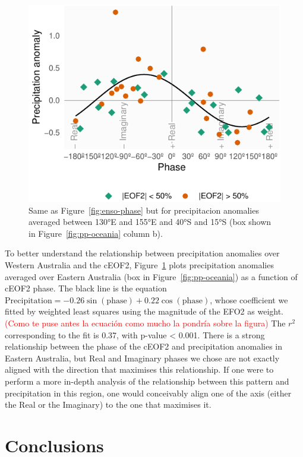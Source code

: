 \documentclass[smallextended]{svjour3}       %
\begin{document}
\begin{figure}
\centering
\includegraphics{../figures/australia-pp-phase-1.pdf}
\caption{\label{fig:australia-pp-phase}Same as Figure~\ref{fig:enso-phase} but for precipitacion anomalies averaged between 130°E and 155°E and 40°S and 15°S (box shown in Figure~\ref{fig:pp-oceania} column b).}
\end{figure}

To better understand the relationship between precipitation anomalies over Western Australia and the cEOF2, Figure~\ref{fig:australia-pp-phase} plots precipitation anomalies averaged over Eastern Australia (box in Figure~\ref{fig:pp-oceania}) as a function of cEOF2 phase. The black line is the equation \(\mathrm{Precipitation} = -0.26\sin{(\mathrm{phase})} + 0.22\cos{(\mathrm{phase})}\), whose coefficient we fitted by weighted least squares using the magnitude of the EFO2 as weight.
\textcolor{red}{(Como te puse antes la ecuación como mucho la pondría sobre la figura)}
The \(r^2\) corresponding to the fit is 0.37, with p-value \textless{} 0.001. There is a strong relationship between the phase of the cEOF2 and precipitation anomalies in Eastern Australia, but Real and Imaginary phases we chose are not exactly aligned with the direction that maximises this relationship. If one were to perform a more in-depth analysis of the relationship between this pattern and precipitation in this region, one would conceivably align one of the axis (either the Real or the Imaginary) to the one that maximises it.



\hypertarget{conclusions}{%
\section{Conclusions}\label{conclusions}}
\end{document}
